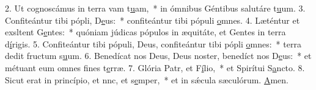 2. Ut cognoscámus in terra vam t\uline{u}am,~* in ómnibus Géntibus salutáre t\uline{u}um.
3. Confiteántur tibi pópli, D\uline{e}us:~* confiteántur tibi pópuli \uline{o}mnes.
4. Læténtur et exsltent G\uline{e}ntes:~* quóniam júdicas pópulos in æquitáte, et Gentes in terra d\uline{í}rigis.
5. Confiteántur tibi pópuli, Deus, confiteántur tibi pópli \uline{o}mnes:~* terra dedit fructum s\uline{u}um.
6. Benedícat nos Deus, Deus noster, benedíct nos D\uline{e}us:~* et métuant eum omnes fines t\uline{e}rræ.
7. Glória Patr, et F\uline{í}lio,~* et Spirítui S\uline{a}ncto.
8. Sicut erat in princípio, et nnc, et s\uline{e}mper,~* et in sǽcula sæculórum. \uline{A}men.
